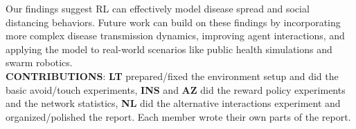 \documentclass[9pt]{IEEEtran}
\begin{document}
Our findings suggest RL can effectively model disease spread and social distancing behaviors. Future work can build on these findings by incorporating more complex disease transmission dynamics, improving agent interactions, and applying the model to real-world scenarios like public health simulations and swarm robotics.
\\

\noindent\textbf{CONTRIBUTIONS}: \textbf{LT} prepared/fixed the environment setup and did the basic avoid/touch experiments, \textbf{INS} and \textbf{AZ} did the reward policy experiments and the network statistics, \textbf{NL} did the alternative interactions experiment and organized/polished the report. Each member wrote their own parts of the report.

\printbibliography
\end{document}
